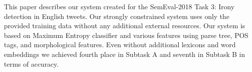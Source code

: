 This paper describes our system created for the SemEval-2018 Task 3:  Irony detection in English tweets. Our strongly constrained system uses only the provided training data without any additional external resources. Our system is based on Maximum Entropy classifier and various features using parse tree, POS tags, and morphological features. Even without additional lexicons and word embeddings we achieved fourth place in Subtask A and seventh in Subtask B in terms of accuracy.
